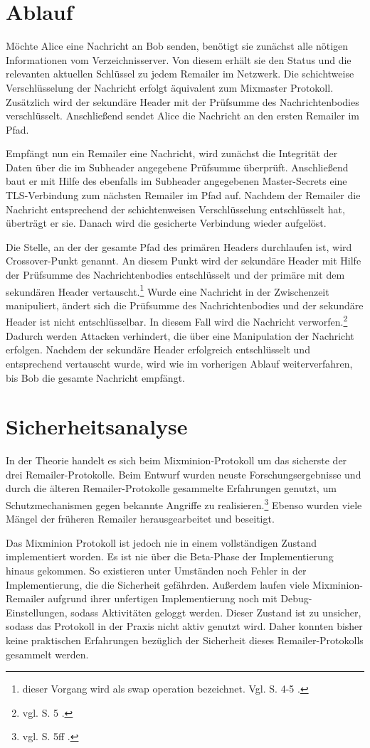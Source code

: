 \section{Ablauf}
Möchte Alice eine Nachricht an Bob senden, benötigt sie zunächst alle nötigen Informationen vom Verzeichnisserver. Von diesem erhält sie den Status und die relevanten aktuellen Schlüssel zu jedem Remailer im Netzwerk. Die schichtweise Verschlüsselung der Nachricht erfolgt äquivalent zum Mixmaster Protokoll. Zusätzlich wird der sekundäre Header mit der Prüfsumme des Nachrichtenbodies verschlüsselt.
Anschließend sendet Alice die Nachricht an den ersten Remailer im Pfad.

Empfängt nun ein Remailer eine Nachricht, wird zunächst die Integrität der Daten über die im Subheader angegebene Prüfsumme überprüft. Anschließend baut er mit Hilfe des ebenfalls im Subheader angegebenen Master-Secrets eine TLS-Verbindung zum nächsten Remailer im Pfad auf. Nachdem der Remailer die Nachricht entsprechend der schichtenweisen Verschlüsselung entschlüsselt hat, überträgt er sie. Danach wird die gesicherte Verbindung wieder aufgelöst.

Die Stelle, an der der gesamte Pfad des primären Headers durchlaufen ist, wird \glqq Crossover\grqq -Punkt genannt. An diesem Punkt wird der sekundäre Header mit Hilfe der Prüfsumme des Nachrichtenbodies entschlüsselt und der primäre mit dem sekundären Header vertauscht.\footnote{dieser Vorgang wird als swap operation bezeichnet. Vgl. S. 4-5 \cite{mixminion}.} Wurde eine Nachricht in der Zwischenzeit manipuliert, ändert sich die Prüfsumme des Nachrichtenbodies und der sekundäre Header ist nicht entschlüsselbar. In diesem Fall wird die Nachricht verworfen.\footnote{vgl. S. 5 \cite{mixminion}.} Dadurch werden Attacken verhindert, die über eine Manipulation der Nachricht erfolgen. Nachdem der sekundäre Header erfolgreich entschlüsselt und entsprechend vertauscht wurde, wird wie im vorherigen Ablauf weiterverfahren, bis Bob die gesamte Nachricht empfängt. 

\section{Sicherheitsanalyse}
In der Theorie handelt es sich beim Mixminion-Protokoll um das sicherste der drei Remailer-Protokolle. Beim Entwurf wurden neuste Forschungsergebnisse und durch die älteren Remailer-Protokolle gesammelte Erfahrungen genutzt, um Schutzmechanismen gegen bekannte Angriffe zu realisieren.\footnote{vgl. S. 5ff \cite{mixminion}.} Ebenso wurden viele Mängel der früheren Remailer herausgearbeitet und beseitigt. 

Das Mixminion Protokoll ist jedoch nie in einem vollständigen Zustand implementiert worden. Es ist nie über die Beta-Phase der Implementierung hinaus gekommen. So existieren unter Umständen noch Fehler in der Implementierung, die die Sicherheit gefährden. Außerdem laufen viele Mixminion-Remailer aufgrund ihrer unfertigen Implementierung noch mit Debug-Einstellungen, sodass Aktivitäten geloggt werden. Dieser Zustand ist zu unsicher, sodass das Protokoll in der Praxis nicht aktiv genutzt wird. Daher konnten bisher keine praktischen Erfahrungen bezüglich der Sicherheit dieses Remailer-Protokolls gesammelt werden.


